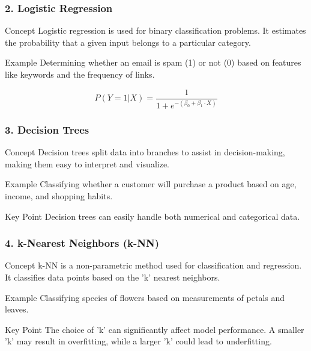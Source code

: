 \documentclass[aspectratio=169]{beamer}
\begin{document}
\begin{frame}[fragile]
    \frametitle{2. Logistic Regression}
    \begin{block}{Concept}
        Logistic regression is used for binary classification problems. It estimates the probability that a given input belongs to a particular category.
    \end{block}
    \begin{block}{Example}
        Determining whether an email is spam (1) or not (0) based on features like keywords and the frequency of links.
    \end{block}
    \begin{equation}
        P(Y=1|X) = \frac{1}{1 + e^{-(\beta_0 + \beta_1 \cdot X)}}
    \end{equation}
\end{frame}

\begin{frame}[fragile]
    \frametitle{3. Decision Trees}
    \begin{block}{Concept}
        Decision trees split data into branches to assist in decision-making, making them easy to interpret and visualize.
    \end{block}
    \begin{block}{Example}
        Classifying whether a customer will purchase a product based on age, income, and shopping habits.
    \end{block}
    \begin{block}{Key Point}
        Decision trees can easily handle both numerical and categorical data.
    \end{block}
\end{frame}

\begin{frame}[fragile]
    \frametitle{4. k-Nearest Neighbors (k-NN)}
    \begin{block}{Concept}
        k-NN is a non-parametric method used for classification and regression. It classifies data points based on the 'k' nearest neighbors.
    \end{block}
    \begin{block}{Example}
        Classifying species of flowers based on measurements of petals and leaves.
    \end{block}
    \begin{block}{Key Point}
        The choice of 'k' can significantly affect model performance. A smaller 'k' may result in overfitting, while a larger 'k' could lead to underfitting.
    \end{block}
\end{frame}
\end{document}
